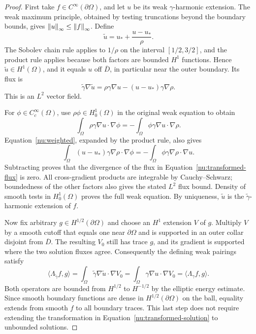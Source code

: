 \begin{proof}
First take \(f\in C^\infty(\partial\Omega)\), and let \(u\)
be its weak \(\gamma\)-harmonic extension. The weak maximum
principle, obtained by testing truncations beyond the boundary bounds,
gives \(\left\lVert u\right\rVert_\infty\le\left\lVert f\right\rVert_\infty\). Define
\begin{equation}\label{nu:transformed-solution}
 \widetilde u=u_*+\frac{u-u_*}{\rho}.
\end{equation}
The Sobolev chain rule applies to \(1/\rho\) on the interval
\([1/2,3/2]\), and the product rule applies because both factors
are bounded \(H^1\) functions. Hence \(\widetilde u\in H^1(\Omega)\),
and it equals \(u\) off \(\overline D\), in particular near
the outer boundary. Its flux is
\begin{equation}\label{nu:transformed-flux}
 \widetilde\gamma\nabla\widetilde u
 =\rho\gamma\nabla u-(u-u_*)\gamma\nabla\rho.
\end{equation}
This is an \(L^2\) vector field.

For \(\phi\in C_c^\infty(\Omega)\), use \(\rho\phi\in H^1_0(\Omega)\)
in the original weak equation to obtain
\[
 \int_\Omega\rho\gamma\nabla u\cdot\nabla\phi
 =-\int_\Omega\phi\gamma\nabla u\cdot\nabla\rho.
\]
Equation~\eqref{nu:weighted}, expanded by the product rule, also gives
\[
 \int_\Omega(u-u_*)\gamma\nabla\rho\cdot\nabla\phi
 =-\int_\Omega\phi\gamma\nabla\rho\cdot\nabla u.
\]
Subtracting proves that the divergence of the flux in
Equation~\eqref{nu:transformed-flux} is zero. All cross-gradient
products are integrable by Cauchy--Schwarz; boundedness of the other
factors also gives the stated \(L^2\) flux bound. Density of smooth
tests in \(H^1_0(\Omega)\) proves the full weak equation.
By uniqueness, \(\widetilde u\) is the
\(\widetilde\gamma\)-harmonic extension of \(f\).

Now fix arbitrary \(g\in H^{1/2}(\partial\Omega)\) and choose
an \(H^1\) extension \(V\) of \(g\). Multiply \(V\) by a smooth
cutoff that equals one near \(\partial\Omega\) and is supported
in an outer collar disjoint from \(\overline D\). The resulting
\(V_0\) still has trace \(g\), and its gradient is supported
where the two solution fluxes agree. Consequently the defining weak
pairings satisfy
\[
 \langle\Lambda_{\widetilde\gamma}f,g\rangle
 =\int_\Omega\widetilde\gamma\nabla\widetilde u\cdot\nabla V_0
 =\int_\Omega\gamma\nabla u\cdot\nabla V_0
 =\langle\Lambda_\gamma f,g\rangle.
\]
Both operators are bounded from \(H^{1/2}\) to \(H^{-1/2}\) by
the elliptic energy estimate. Since smooth boundary functions are
dense in \(H^{1/2}(\partial\Omega)\) on the ball, equality extends
from smooth \(f\) to all boundary traces. This last step does not
require extending the transformation in
Equation~\eqref{nu:transformed-solution} to unbounded solutions.
\end{proof}

